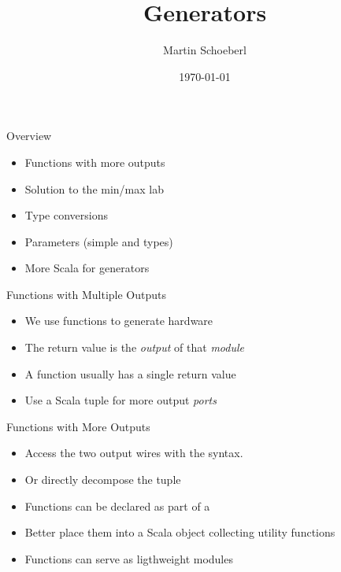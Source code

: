 

\newif\ifbook


\usepackage{tikz}
\usetikzlibrary{positioning, arrows.meta}


\title{Generators}
\author{Martin Schoeberl}
\date{\today}



\begin{frame}
\titlepage
\end{frame}

\begin{frame}[fragile]{Overview}
\begin{itemize}
\item Functions with more outputs
\item Solution to the min/max lab
\item Type conversions
\item Parameters (simple and types)
\item More Scala for generators
\end{itemize}
\end{frame}

\begin{frame}[fragile]{Functions with Multiple Outputs}
\begin{itemize}
\item We use functions to generate hardware
\item The return value is the \emph{output} of that \emph{module}
\item A function usually has a single return value
\item Use a Scala tuple for more output \emph{ports}
\end{itemize}
\end{frame}

\begin{frame}[fragile]{Functions with More Outputs}
\begin{itemize}
\item Access the two output wires with the  syntax.
\item Or directly decompose the tuple
\item Functions can be declared as part of a 
\item Better place them into a Scala object collecting utility functions
\item Functions can serve as ligthweight modules
\end{itemize}
\end{frame}


